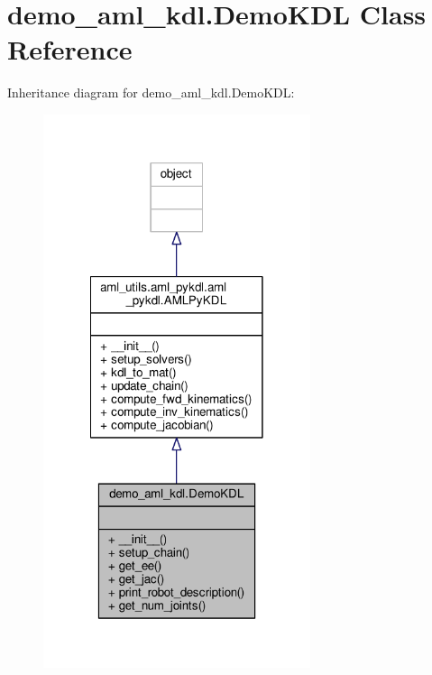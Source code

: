 \hypertarget{classdemo__aml__kdl_1_1_demo_k_d_l}{\section{demo\-\_\-aml\-\_\-kdl.\-Demo\-K\-D\-L Class Reference}
\label{classdemo__aml__kdl_1_1_demo_k_d_l}
}


Inheritance diagram for demo\-\_\-aml\-\_\-kdl.\-Demo\-K\-D\-L\-:
\nopagebreak
\begin{figure}[H]
\begin{center}
\leavevmode
\includegraphics[width=222pt]{classdemo__aml__kdl_1_1_demo_k_d_l__inherit__graph}
\end{center}
\end{figure}


